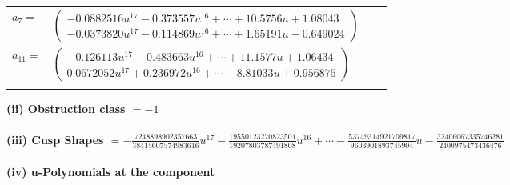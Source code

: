 \documentclass[1p]{elsarticle_modified}
\theoremstyle{definition}
\begin{document}
\begin{tabular}{m{7pt} m{180pt} m{7pt} m{180pt} }
\flushright $a_{7}=$&$\begin{pmatrix}-0.0882516 u^{17}-0.373557 u^{16}+\cdots+10.5756 u+1.08043\\-0.0373820 u^{17}-0.114869 u^{16}+\cdots+1.65191 u-0.649024\end{pmatrix}$ \\
\flushright $a_{11}=$&$\begin{pmatrix}-0.126113 u^{17}-0.483663 u^{16}+\cdots+11.1577 u+1.06434\\0.0672052 u^{17}+0.236972 u^{16}+\cdots-8.81033 u+0.956875\end{pmatrix}$\\&\end{tabular}
\flushleft \textbf{(ii) Obstruction class $= -1$}\\~\\
\flushleft \textbf{(iii) Cusp Shapes $= -\frac{7248898902357663}{38415607574983616} u^{17}-\frac{19550123270823501}{19207803787491808} u^{16}+\cdots-\frac{53749314921709817}{9603901893745904} u-\frac{32406067335746281}{2400975473436476}$}\\~\\
\newpage\renewcommand{\arraystretch}{1}
\flushleft \textbf{(iv) u-Polynomials at the component}\newline \\
\end{document}

